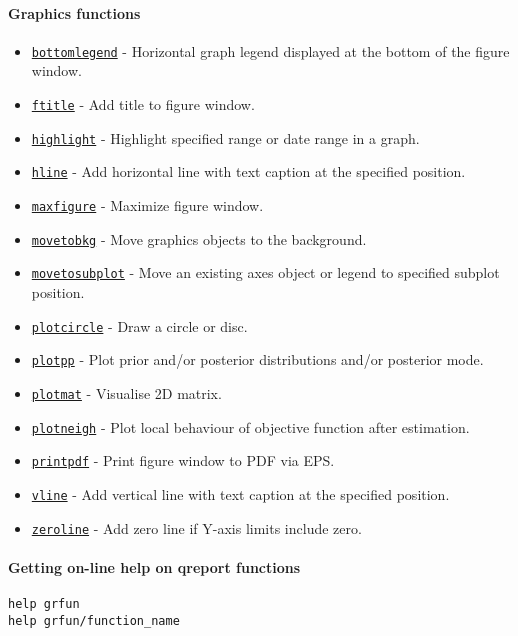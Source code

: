 

	\paragraph{Graphics functions}

\begin{itemize}
\itemsep1pt\parskip0pt
\item
  \href{grfun/bottomlegend}{\texttt{bottomlegend}} - Horizontal graph
  legend displayed at the bottom of the figure window.
\item
  \href{grfun/ftitle}{\texttt{ftitle}} - Add title to figure window.
\item
  \href{grfun/highlight}{\texttt{highlight}} - Highlight specified range
  or date range in a graph.
\item
  \href{grfun/hline}{\texttt{hline}} - Add horizontal line with text
  caption at the specified position.
\item
  \href{grfun/maxfigure}{\texttt{maxfigure}} - Maximize figure window.
\item
  \href{grfun/movetobkg}{\texttt{movetobkg}} - Move graphics objects to
  the background.
\item
  \href{grfun/movetosubplot}{\texttt{movetosubplot}} - Move an existing
  axes object or legend to specified subplot position.
\item
  \href{grfun/plotcircle}{\texttt{plotcircle}} - Draw a circle or disc.
\item
  \href{grfun/plotpp}{\texttt{plotpp}} - Plot prior and/or posterior
  distributions and/or posterior mode.
\item
  \href{grfun/plotmat}{\texttt{plotmat}} - Visualise 2D matrix.
\item
  \href{grfun/plotneigh}{\texttt{plotneigh}} - Plot local behaviour of
  objective function after estimation.
\item
  \href{grfun/printpdf}{\texttt{printpdf}} - Print figure window to PDF
  via EPS.
\item
  \href{grfun/vline}{\texttt{vline}} - Add vertical line with text
  caption at the specified position.
\item
  \href{grfun/zeroline}{\texttt{zeroline}} - Add zero line if Y-axis
  limits include zero.
\end{itemize}

\paragraph{Getting on-line help on qreport
functions}

\begin{verbatim}
help grfun
help grfun/function_name
\end{verbatim}



